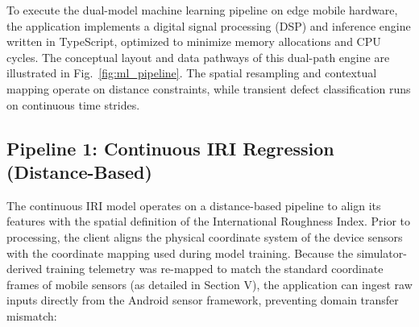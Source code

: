 \documentclass[conference]{IEEEtran}
\begin{document}
To execute the dual-model machine learning pipeline on edge mobile hardware, the application implements a digital signal processing (DSP) and inference engine written in TypeScript, optimized to minimize memory allocations and CPU cycles. The conceptual layout and data pathways of this dual-path engine are illustrated in Fig.~\ref{fig:ml_pipeline}. The spatial resampling and contextual mapping operate on distance constraints, while transient defect classification runs on continuous time strides.

\subsection{Pipeline 1: Continuous IRI Regression (Distance-Based)}
The continuous IRI model operates on a distance-based pipeline to align its features with the spatial definition of the International Roughness Index. Prior to processing, the client aligns the physical coordinate system of the device sensors with the coordinate mapping used during model training. Because the simulator-derived training telemetry was re-mapped to match the standard coordinate frames of mobile sensors (as detailed in Section V), the application can ingest raw inputs directly from the Android sensor framework, preventing domain transfer mismatch:
\end{document}
